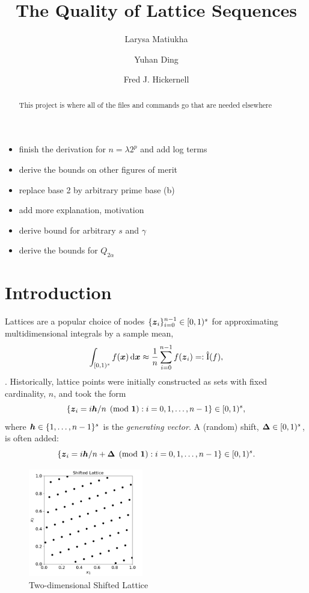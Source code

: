\documentclass{amsart}
\DeclareMathOperator{\appxint}{\hat{I}}
\begin{document}
\title{The Quality of Lattice Sequences}
\author{Larysa Matiukha}
\author{Yuhan Ding}
\author{Fred J. Hickernell}
\begin{abstract}This project is where all of the files and commands go that are needed elsewhere
\end{abstract}

\maketitle

\begin{itemize}
    \item finish the derivation for $n = \lambda 2^p$ and add log terms 
    \item derive the bounds on other figures of merit
    \item replace base 2 by arbitrary prime base (b)
    \item add more explanation, motivation 
    \item derive bound for arbitrary $s$ and $\gamma$
    \item derive the bounds for $Q_{2\alpha}$
\end{itemize}

\section{Introduction}
Lattices are a popular choice of nodes $\{\boldsymbol{z}_i\}_{i=0}^{n-1} \in [0,1)^s$ for approximating multidimensional integrals by a sample mean,
\[
\int_{[0,1)^s} f(\vx) \, \dif \vx \approx \frac{1}{n} \sum_{i=0}^{n-1} f(\vz_i) =:\appxint(f),
\]
\cite{DicEtal22a,Nie92,SloJoe94}.
Historically, lattice points were initially constructed as sets with fixed cardinality, $n$, and took the form
\begin{equation} \label{eq:lat}
    \{\boldsymbol{z}_i = i \boldsymbol{h}/n \pmod{\boldsymbol{1}} : i=0,1, \ldots, n-1 \} \in [0,1)^s,
\end{equation}
where $\boldsymbol{h} \in \{1, \ldots, n-1\}^s$ is the \emph{generating vector}.  A (random) shift, $\boldsymbol{\Delta} \in [0,1)^s$, is often added:
\begin{equation} \label{eq:shlat}
    \{\boldsymbol{z}_i = i \boldsymbol{h}/n + \boldsymbol{\Delta} \pmod{\boldsymbol{1}} : i=0,1, \ldots, n-1 \} \in [0,1)^s.
\end{equation}

\begin{figure}[h]
\includegraphics[width=5cm,trim={0 0 0 7.5mm},clip]{shifted-lattice}
\caption{Two-dimensional Shifted Lattice}
\label{fig:enter-label}
\end{figure}
\end{document}
